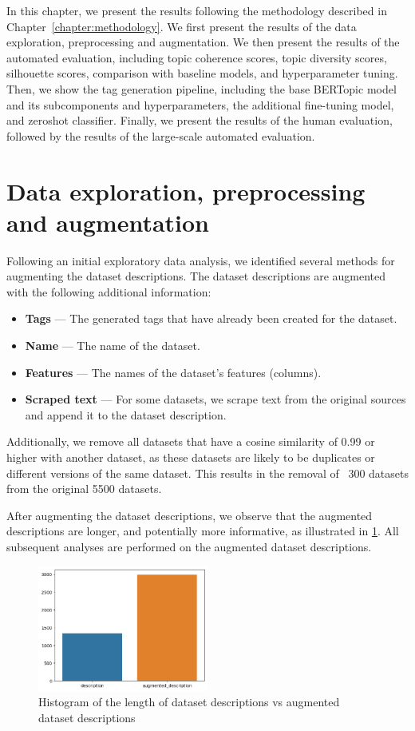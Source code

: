 In this chapter, we present the results following the methodology described in Chapter~\ref{chapter:methodology}. We first present the results of the data exploration, preprocessing and augmentation. We then present the results of the automated evaluation, including topic coherence scores, topic diversity scores, silhouette scores, comparison with baseline models, and hyperparameter tuning. Then, we show the tag generation pipeline, including the base BERTopic model and its subcomponents and hyperparameters, the additional fine-tuning model, and zeroshot classifier. Finally, we present the results of the human evaluation, followed by the results of the large-scale automated evaluation.

\section{Data exploration, preprocessing and augmentation}
Following an initial exploratory data analysis, we identified several methods for augmenting the dataset descriptions. The dataset descriptions are augmented with the following additional information:

\begin{itemize}
\item \textbf{Tags} — The generated tags that have already been created for the dataset.
\item \textbf{Name} — The name of the dataset.
\item \textbf{Features} — The names of the dataset's features (columns).
\item \textbf{Scraped text} — For some datasets, we scrape text from the original sources and append it to the dataset description.
\end{itemize}

Additionally, we remove all datasets that have a cosine similarity of 0.99 or higher with another dataset, as these datasets are likely to be duplicates or different versions of the same dataset. This results in the removal of ~300 datasets from the original 5500 datasets.

After augmenting the dataset descriptions, we observe that the augmented descriptions are longer, and potentially more informative, as illustrated in \cref{fig:description_vs_augmented_description.png}. All subsequent analyses are performed on the augmented dataset descriptions.

\begin{figure}[h]
    \centering
    \includegraphics[width=0.5\textwidth]{figures/description_vs_augmented_description.png}
    \caption{Histogram of the length of dataset descriptions vs augmented dataset descriptions}
    \label{fig:description_vs_augmented_description.png}
\end{figure}


